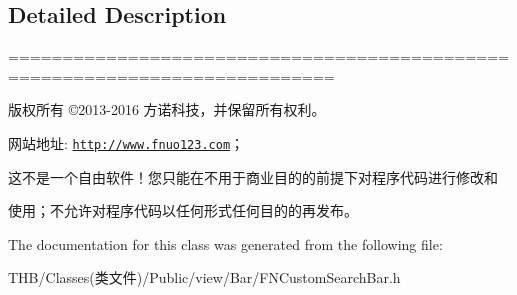\subsection{Detailed Description}
============================================================================

版权所有 ©2013-\/2016 方诺科技，并保留所有权利。

网站地址\+: \href{http://www.fnuo123.com}{\tt http\+://www.\+fnuo123.\+com}； 



这不是一个自由软件！您只能在不用于商业目的的前提下对程序代码进行修改和

使用；不允许对程序代码以任何形式任何目的的再发布。 

 

The documentation for this class was generated from the following file\+:\begin{DoxyCompactItemize}
\item 
T\+H\+B/\+Classes(类文件)/\+Public/view/\+Bar/F\+N\+Custom\+Search\+Bar.\+h\end{DoxyCompactItemize}
